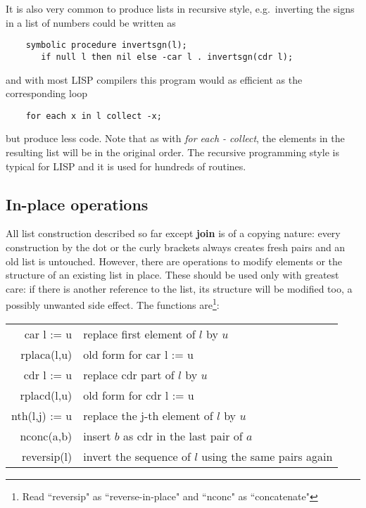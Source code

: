 It is also very common to produce lists in recursive style, 
e.g.\  inverting the signs in a list of numbers could be written as
\begin{verbatim}
    symbolic procedure invertsgn(l);
       if null l then nil else -car l . invertsgn(cdr l);
\end{verbatim}
and with most LISP compilers this program would as  efficient 
as  the corresponding loop
\begin{verbatim}
    for each x in l collect -x;
\end{verbatim}
but produce less code.
Note that as with {\em for each - collect}, the elements in the resulting
list will be in the original order.
The recursive programming style is typical for LISP and it
is used for  hundreds of {\reduce} routines.

\subsection{In-place operations}

All list construction  described so far except {\bf join} 
is of a copying nature:
every construction by the dot or the curly brackets always creates
fresh pairs and an old list is untouched. However, there are operations
to modify elements or the structure of an existing list in place. These should
be used only with greatest care: if there is another reference to the list,
its structure will be modified too, a possibly unwanted side effect.
The functions 
are\footnote{Read ``reversip" as ``reverse-in-place" and ``nconc" as 
``concatenate"}:
\begin{center}
\begin{tabular}{|r|l|} \hline
 car l := u & replace first element of $l$ by $u$ \\
 rplaca(l,u) & old form for car l := u\\
 cdr l := u & replace cdr part of $l$ by $u$ \\
 rplacd(l,u) & old form for cdr l := u\\
 nth(l,j) := u & replace the j-th element of $l$ by $u$\\
 nconc(a,b)  & insert $b$ as cdr in the last pair of $a$\\
 reversip(l) & invert the sequence of $l$ using the same pairs again\\
\hline
\end{tabular}
\end{center}



